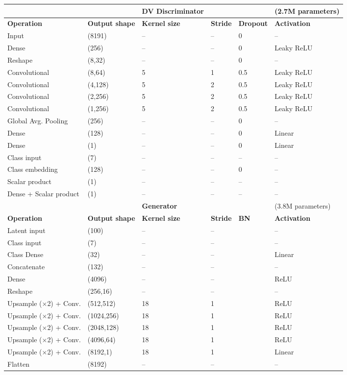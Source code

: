 \documentclass[reprint,nofootinbib,amsmath,amssymb,aps,floatfix]{revtex4-2}
\newcommand{\cmark}{\ding{51}}
\newcommand{\xmark}{\ding{55}}
\begin{document}
\begin{table}[H]
{\begin{tabular}{llllll}
{} & {} & \textbf{DV Discriminator} & {} & {} & {(2.7M parameters)} \\ \hline
\textbf{Operation} & \textbf{Output shape} & \textbf{Kernel size} & \textbf{Stride} & \textbf{Dropout} & \textbf{Activation} \\ \hline
Input & (8191) & -- & -- & 0 & -- \\
Dense & (256) & -- & -- & 0 & Leaky ReLU \\
Reshape & (8,32) & -- & -- & 0 & -- \\
Convolutional & (8,64) & 5 & 1 & 0.5 & Leaky ReLU \\
Convolutional & (4,128) & 5 & 2 & 0.5 & Leaky ReLU \\
Convolutional & (2,256) & 5 & 2 & 0.5 & Leaky ReLU \\
Convolutional & (1,256) & 5 & 2 & 0.5 & Leaky ReLU \\
Global Avg. Pooling & (256) & -- & -- & 0 & -- \\
Dense & (128) & -- & -- & 0 & Linear \\
Dense & (1) & -- & -- & 0 & Linear \\
Class input & (7) & -- & -- & -- & -- \\
Class embedding & (128) & -- & -- & 0 & -- \\
Scalar product & (1) & -- & -- & -- & -- \\
Dense + Scalar product & (1) & -- & -- & -- & -- \\ \bottomrule

{} & {} & \textbf{Generator} & {} & {} & {(3.8M parameters)} \\ \hline
\textbf{Operation} & \textbf{Output shape} & \textbf{Kernel size} & \textbf{Stride} & \textbf{BN} & \textbf{Activation} \\ \hline
Latent input & (100) & -- & -- & \xmark & -- \\
Class input & (7) & -- & -- & \xmark & -- \\
Class Dense & (32) & -- & -- & \xmark & Linear \\
Concatenate & (132) & -- & -- & \xmark & -- \\
Dense & (4096) & -- & -- & \xmark & ReLU \\
Reshape & (256,16) & -- & -- & \xmark & -- \\
Upsample ($\times$2) + Conv. & (512,512) & 18 & 1 & \cmark & ReLU \\
Upsample ($\times$2) + Conv. & (1024,256) & 18 & 1 & \cmark & ReLU \\
Upsample ($\times$2) + Conv. & (2048,128) & 18 & 1 & \cmark & ReLU \\
Upsample ($\times$2) + Conv. & (4096,64) & 18 & 1 & \cmark & ReLU \\
Upsample ($\times$2) + Conv. & (8192,1) & 18 & 1 & \xmark & Linear \\
Flatten & (8192) & -- & -- & \xmark & -- \\ \hline


\end{tabular}}
\end{table}
\end{document}
